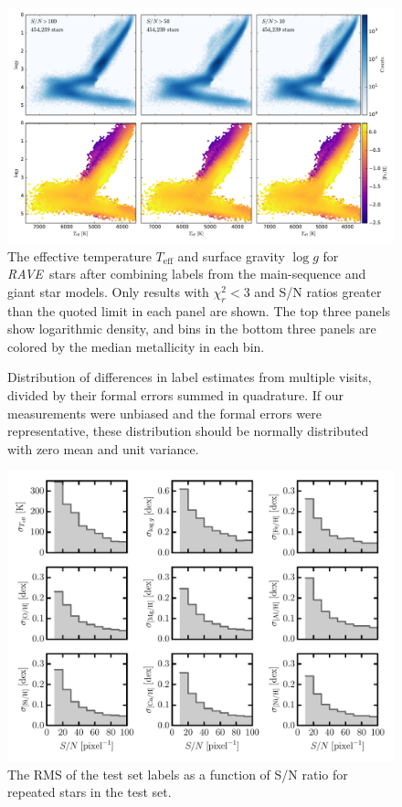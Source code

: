 \documentclass[preprint,trackchanges]{aastex}
\newcommand{\acronym}[1]{{\small{#1}}}
\newcommand{\project}[1]{\textsl{#1}}
\newcommand{\rave}{\project{\acronym{RAVE}}}
\newcommand{\teff}{T_{\mathrm{eff}}}
\newcommand{\logg}{\log g}
\begin{document}
\begin{figure}[p]
\includegraphics[width=\textwidth]{figures/hrd-test-set.pdf}
\caption{The effective temperature $\teff$ and surface gravity $\logg$ for \rave\ stars after combining labels from the main-sequence and giant star models.  Only results with $\chi_{r}^2 < 3$ and S/N ratios greater than the quoted limit in each panel are shown.  The top three panels show logarithmic density, and bins in the bottom three panels are colored by the median metallicity in each bin.\label{fig:test-set-hrd}}
\end{figure}


\begin{figure}[p]
\caption{Distribution of differences in label estimates from multiple visits, divided by their formal errors summed in quadrature.  If our measurements were unbiased and the formal errors were representative, these distribution should be normally distributed with zero mean and unit variance.\label{fig:formal-errors-comparison}}
\end{figure}


\begin{figure}[p]
\includegraphics[width=\textwidth]{figures/repeat-visits.pdf}
\caption{The RMS of the test set labels as a function of S/N ratio for repeated stars in the test set.\label{fig:repeat-visits}}
\end{figure}
\end{document}
